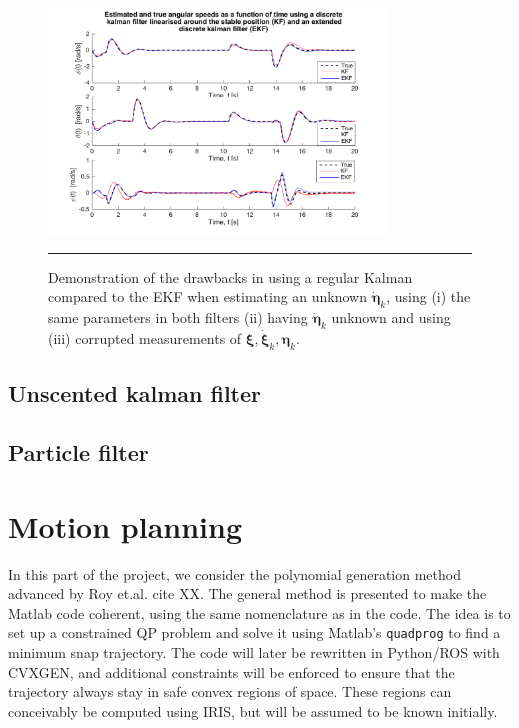 \documentclass{article}
\begin{document}
\begin{figure}[htbp]
\centering
\includegraphics[width=0.8\textwidth]{figures/kalman-EKF.png}
\rule{35em}{0.5pt}
\caption{Demonstration of the drawbacks in using a regular Kalman compared to the EKF when estimating an unknown $\dot{\boldsymbol\eta}_k$, using (i) the same parameters in both filters (ii) having $\dot{\boldsymbol\eta}_k$ unknown and using (iii) corrupted measurements of $\boldsymbol\xi, \dot{\boldsymbol\xi}_k, \boldsymbol\eta_k$.}
\label{fig:KF-EKF}
\end{figure}

\subsection{Unscented kalman filter}

\subsection{Particle filter}

\section{Motion planning}\label{sec:reftraj}
In this part of the project, we consider the polynomial generation method advanced by Roy et.al. cite XX. The general method is presented to make the Matlab code coherent, using the same nomenclature as in the code. The idea is to set up a constrained QP problem and solve it using Matlab's \texttt{quadprog} to find a minimum snap trajectory. The code will later be rewritten in Python/ROS with CVXGEN, and additional constraints will be enforced to ensure that the trajectory always stay in safe convex regions of space. These regions can conceivably be computed using IRIS, but will be assumed to be known initially.
\end{document}
